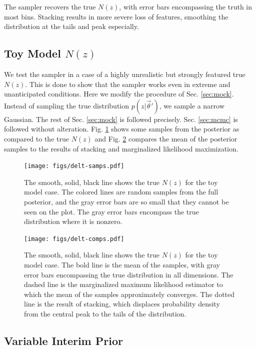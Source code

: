 \documentclass[preprint]{aastex}
\begin{document}
The sampler recovers the true $N(z)$, with error bars encompassing the truth in 
most bins.  Stacking results in more severe loss of features, smoothing the 
distribution at the tails and peak especially.  

\clearpage
\subsection{Toy Model $N(z)$}
\label{sec:fake}

We test the sampler in a case of a highly unrealistic but strongly featured 
true $N(z)$.  This is done to show that the sampler works even in extreme and 
unanticipated conditions.  Here we modify the procedure of Sec. \ref{sec:mock}. 
 Instead of sampling the true distribution $p(z|\vec{\theta}')$, we sample a 
narrow Gaussian.  The rest of Sec. \ref{sec:mock} is followed precisely.  Sec. 
\ref{sec:mcmc} is followed without alteration.  Fig. \ref{fig:toy-samp} shows 
some samples from the posterior as compared to the true $N(z)$ and Fig. 
\ref{fig:toy-comp} compares the mean of the posterior samples to the results of 
stacking and marginalized likelihood maximization.

\begin{figure}
\texttt{[image: figs/delt-samps.pdf]}
\caption{The smooth, solid, black line shows the true $N(z)$ for the toy model 
case.  The colored lines are random samples from the full posterior, and the 
gray error bars are so small that they cannot be seen on the plot.  The gray 
error bars encompass the true distribution where it is nonzero.}
\label{fig:toy-samp}
\end{figure}

\begin{figure}
\texttt{[image: figs/delt-comps.pdf]}
\caption{The smooth, solid, black line shows the true $N(z)$ for the toy model 
case.  The bold line is the mean of the samples, with gray error bars 
encompassing the true distribution in all dimensions.  The dashed line is the 
marginalized maximum likelihood estimator to which the mean of the samples 
approximately converges.  The dotted line is the result of stacking, which 
displaces probability density from the central peak to the tails of the 
distribution.}
\label{fig:toy-comp}
\end{figure}

\clearpage
\subsection{Variable Interim Prior}
\label{sec:interim}
\end{document}
